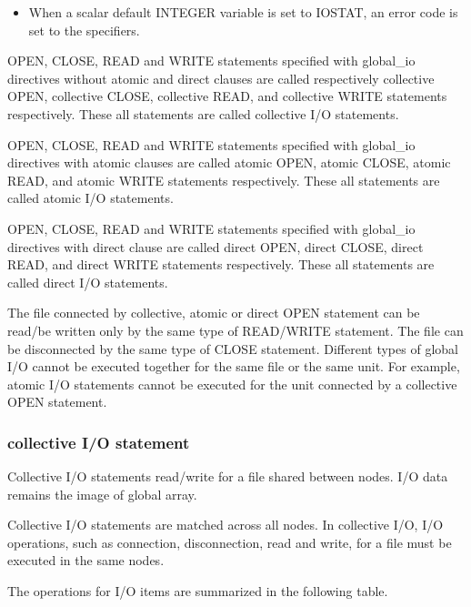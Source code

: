 \begin{itemize}
    \item When a scalar default INTEGER variable is set to IOSTAT, an
	  error code is set to the specifiers.
	 
   \end{itemize}

   OPEN, CLOSE, READ and WRITE statements specified with global\_io directives
   without atomic and direct clauses are called respectively collective OPEN, collective
   CLOSE, collective READ, and collective WRITE statements respectively.
   These all statements are called collective I/O statements.

   OPEN, CLOSE, READ and WRITE statements specified with global\_io directives
   with atomic clauses are called atomic OPEN, atomic CLOSE, atomic READ, and
   atomic WRITE statements respectively.
   These all statements are called atomic I/O statements.

   OPEN, CLOSE, READ and WRITE statements specified with global\_io directives
   with direct clause are called direct OPEN, direct CLOSE, direct READ, and
   direct WRITE statements respectively.
   These all statements are called direct I/O statements.

   The file connected by collective, atomic or direct OPEN statement can
   be read/be written only by the same type of READ/WRITE statement.
   The file can be disconnected by the same type of CLOSE statement.
   Different types of global I/O cannot be executed together for the same file or the
   same unit.
   For example, atomic I/O statements cannot be executed for the unit
   connected by a collective OPEN statement.

   \clearpage
   
   \subsubsection{collective I/O statement}

   Collective I/O statements read/write for a file shared between nodes.
   I/O data remains the image of global array.

   Collective I/O statements are matched across all nodes.
   In collective I/O, I/O operations, such as connection, disconnection,
   read and write, for a file must be executed in the same nodes. 
   
   The operations for I/O items are summarized in the following table.

